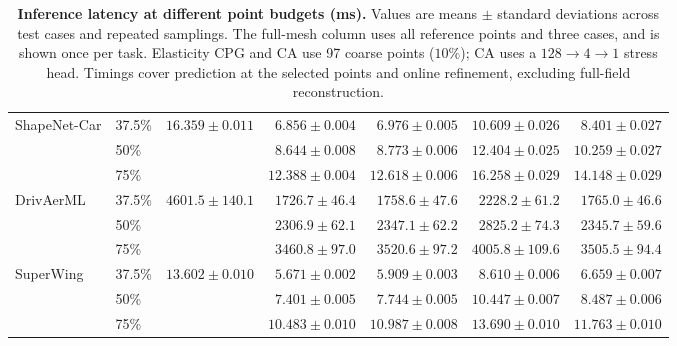 \begin{table}[!ht]
\begin{tabular}{llrrrrr}
\addlinespace[2pt]
ShapeNet-Car & 37.5\% & $16.359\!\pm\!0.011$ & $6.856\!\pm\!0.004$ & $6.976\!\pm\!0.005$ & $10.609\!\pm\!0.026$ & $8.401\!\pm\!0.027$ \\
 & 50\% &  & $8.644\!\pm\!0.008$ & $8.773\!\pm\!0.006$ & $12.404\!\pm\!0.025$ & $10.259\!\pm\!0.027$ \\
 & 75\% &  & $12.388\!\pm\!0.004$ & $12.618\!\pm\!0.006$ & $16.258\!\pm\!0.029$ & $14.148\!\pm\!0.029$ \\
\addlinespace[2pt]
DrivAerML & 37.5\% & $4601.5\!\pm\!140.1$ & $1726.7\!\pm\!46.4$ & $1758.6\!\pm\!47.6$ & $2228.2\!\pm\!61.2$ & $1765.0\!\pm\!46.6$ \\
 & 50\% &  & $2306.9\!\pm\!62.1$ & $2347.1\!\pm\!62.2$ & $2825.2\!\pm\!74.3$ & $2345.7\!\pm\!59.6$ \\
 & 75\% &  & $3460.8\!\pm\!97.0$ & $3520.6\!\pm\!97.2$ & $4005.8\!\pm\!109.6$ & $3505.5\!\pm\!94.4$ \\
\addlinespace[2pt]
SuperWing & 37.5\% & $13.602\!\pm\!0.010$ & $5.671\!\pm\!0.002$ & $5.909\!\pm\!0.003$ & $8.610\!\pm\!0.006$ & $6.659\!\pm\!0.007$ \\
 & 50\% &  & $7.401\!\pm\!0.005$ & $7.744\!\pm\!0.005$ & $10.447\!\pm\!0.007$ & $8.487\!\pm\!0.006$ \\
 & 75\% &  & $10.483\!\pm\!0.010$ & $10.987\!\pm\!0.008$ & $13.690\!\pm\!0.010$ & $11.763\!\pm\!0.010$ \\
\bottomrule
\end{tabular}
\endgroup
\caption{\textbf{Inference latency at different point budgets (ms).}
Values are means $\pm$ standard deviations across test cases and repeated samplings.
The full-mesh column uses all reference points and three cases, and is shown once per task.
Elasticity CPG and CA use 97 coarse points ($10\%$); CA uses a $128\!\to\!4\!\to\!1$ stress head.
Timings cover prediction at the selected points and online refinement, excluding full-field reconstruction.}
\label{tab:inference_time_sampled}
\end{table}
